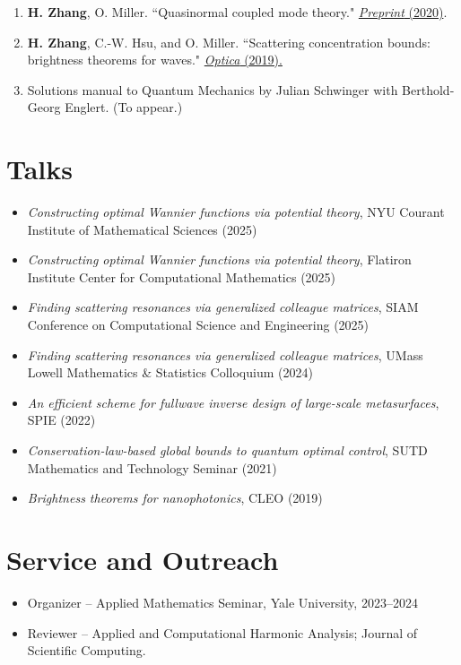 \documentclass[margin,line,pifont,palatino,courier]{res}
\begin{document}
\begin{resume}
\begin{enumerate}
	\item{\textbf{H. Zhang}, O. Miller. ``Quasinormal coupled mode theory." \href{https://arxiv.org/abs/2010.08650}{\color{blue} \emph{Preprint} (2020)}.}
	\item{\textbf{H. Zhang}, C.-W. Hsu, and O. Miller. ``Scattering concentration bounds: brightness theorems for waves." \href{https://doi.org/10.1364/OPTICA.6.001321}{\color{blue} \emph{Optica} (2019).}}
	\item{Solutions manual to Quantum Mechanics by Julian Schwinger with Berthold-Georg Englert. (To appear.)}
\end{enumerate}

\section{\sc Talks}
\begin{itemize}
		\item \emph{Constructing optimal Wannier functions via potential theory}, NYU Courant Institute of Mathematical Sciences (2025)
		\item \emph{Constructing optimal Wannier functions via potential theory}, Flatiron Institute  Center for Computational Mathematics (2025)
	\item \emph{Finding scattering resonances via generalized colleague matrices}, SIAM Conference on Computational Science and Engineering (2025)
	\item \emph{Finding scattering resonances via generalized colleague matrices}, UMass Lowell Mathematics \& Statistics Colloquium (2024)
	\item \emph{An efficient scheme for fullwave inverse design of large-scale metasurfaces}, SPIE (2022)
	\item \emph{Conservation-law-based global bounds to quantum optimal control}, SUTD Mathematics and Technology Seminar (2021)
	\item \emph{Brightness theorems for nanophotonics}, CLEO (2019)
\end{itemize}


\section{\sc Service and Outreach}
\begin{itemize}
	\setlength\itemsep{0em}
	\item	Organizer -- Applied Mathematics Seminar, Yale University, 2023--2024\\
	\item Reviewer -- Applied and Computational Harmonic Analysis; Journal of Scientific Computing.
\end{itemize}



\end{resume}
\end{document}
